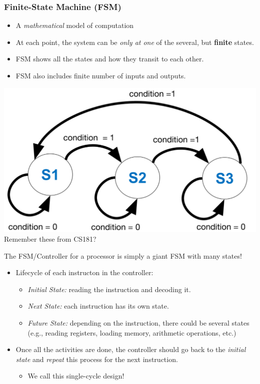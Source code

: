 \documentclass[10pt]{article}
\begin{document}
\subsubsection*{Finite-State Machine (FSM)}
\begin{itemize}
    \item A \textit{mathematical} model of computation
    \item At each point, the system can be \textit{only at one} of the several, but \textbf{finite} states.
    \item FSM shows all the states and how they transit to each other.
    \item FSM also includes finite number of inputs and outputs.
\end{itemize}
\begin{center}
    \includegraphics*[scale=0.5]{W2_6.png}
    Remember these from CS181?
\end{center}
The FSM/Controller for a processor is simply a giant FSM with many states!
\begin{itemize}
    \item Lifecycle of each instructon in the controller:
    \begin{itemize}
        \item \textit{Initial State:} reading the instruction and decoding it.
        \item \textit{Next State:} each instruction has its own state.
        \item \textit{Future State:} depending on the instruction, there could be several states (e.g., reading registers, loading memory, arithmetic operations, etc.)
    \end{itemize}
    \item Once all the activities are done, the controller should go back to the \textit{initial state} and \textit{repeat} this process for the next instruction.
    \begin{itemize}
        \item We call this single-cycle design!
    \end{itemize}
\end{itemize}
\end{document}
